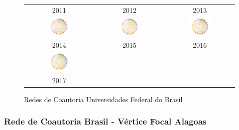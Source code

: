 \documentclass[12pt]{article}
\begin{document}
\begin{figure}[H]
\begin{tabular}{ccc}
2011 & 2012 & 2013\\[6pt]
\includegraphics[width=0.35\textwidth]{images/rede-2014.pdf} &
\includegraphics[width=0.35\textwidth]{images/rede-2015.pdf} &
\includegraphics[width=0.35\textwidth]{images/rede-2016.pdf} \\
2014 & 2015 & 2016\\[6pt]  \includegraphics[width=0.35\textwidth]{images/rede-2017.pdf} & & \\
2017 & & \\
\end{tabular}
\caption{Redes de Coautoria Universidades Federal do Brasil}
\end{figure}





\subsubsection{Rede de Coautoria Brasil - Vértice Focal Alagoas}
\end{document}
